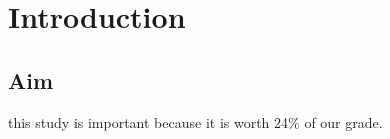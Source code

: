 \section{Introduction}

\subsection{Aim}


this study is important because it is worth 24\% of our grade.
